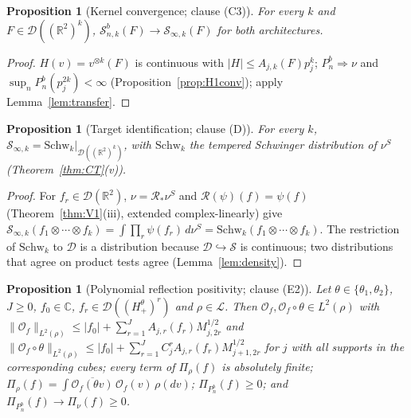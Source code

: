 \documentclass[11pt]{article}
\theoremstyle{plain}
\newtheorem{proposition}[theorem]{Proposition}
\theoremstyle{definition}
\theoremstyle{remark}
\newcommand{\R}{\mathbb{R}}
\newcommand{\C}{\mathbb{C}}
\newcommand{\cD}{\mathcal{D}}
\newcommand{\cL}{\mathcal{L}}
\newcommand{\cO}{\mathcal{O}}
\newcommand{\cS}{\mathcal{S}}
\newcommand{\Schw}{\mathrm{Schw}}
\newcommand{\conj}[1]{\overline{#1}}
\begin{document}
\begin{proposition}[Kernel convergence; clause (C3)]\label{prop:kernelconv}
For every $k$ and $F\in\cD((\R^{2})^{k})$, $\cS^{b}_{n,k}(F)\to\cS_{\infty,k}(F)$ for both
architectures.
\end{proposition}

\begin{proof}
$H(v)=v^{\otimes k}(F)$ is continuous with $|H|\le A_{j,k}(F)p_j^{k}$; $P^{b}_{n}\Rightarrow\nu$ and
$\sup_nP^{b}_{n}(p_j^{2k})<\infty$ (Proposition~\ref{prop:H1conv}); apply
Lemma~\ref{lem:transfer}.
\end{proof}

\begin{proposition}[Target identification; clause (D)]\label{prop:identification}
For every $k$, $\cS_{\infty,k}=\Schw_k|_{\cD((\R^{2})^{k})}$, with $\Schw_k$ the tempered Schwinger
distribution of $\nu^{S}$ (Theorem~\ref{thm:CT}(v)).
\end{proposition}

\begin{proof}
For $f_r\in\cD(\R^{2})$, $\nu=\mathcal R_*\nu^{S}$ and $\mathcal R(\psi)(f)=\psi(f)$
(Theorem~\ref{thm:V1}(iii), extended complex-linearly) give
$\cS_{\infty,k}(f_1\otimes\cdots\otimes f_k)=\int\prod_r\psi(f_r)\,d\nu^{S}=\Schw_k(f_1\otimes\cdots\otimes f_k)$. The
restriction of $\Schw_k$ to $\cD$ is a distribution because $\cD\hookrightarrow\cS$ is continuous;
two distributions that agree on product tests agree (Lemma~\ref{lem:density}).
\end{proof}

\begin{proposition}[Polynomial reflection positivity; clause (E2)]\label{prop:polyRP}
Let $\theta\in\{\theta_1,\theta_2\}$, $J\ge0$, $f_0\in\C$, $f_r\in\cD((H^{\theta}_{+})^{r})$ and $\rho\in\cL$. Then
$\cO_f,\cO_f\circ\theta\in L^{2}(\rho)$ with
$\|\cO_f\|_{L^{2}(\rho)}\le|f_0|+\sum_{r=1}^{J}A_{j,r}(f_r)M_{j,2r}^{1/2}$ and
$\|\cO_f\circ\theta\|_{L^{2}(\rho)}\le|f_0|+\sum_{r=1}^{J}C_j^{r}A_{j,r}(f_r)M_{j+1,2r}^{1/2}$ for $j$ with all
supports in the corresponding cubes; every term of $\Pi_\rho(f)$ is absolutely finite;
$\Pi_\rho(f)=\int\conj{\cO_f(\theta v)}\,\cO_f(v)\,\rho(dv)$; $\Pi_{P^{b}_{n}}(f)\ge0$; and
$\Pi_{P^{b}_{n}}(f)\to\Pi_\nu(f)\ge0$.
\end{proposition}
\end{document}
